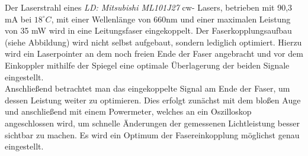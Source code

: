
Der Laserstrahl eines \textit{LD: Mitsubishi ML101J27} cw- Lasers, betrieben mit 90,3 mA bei $18^\circ C$, mit einer Wellenlänge von 660nm und einer maximalen Leistung von 35 mW wird in eine Leitungsfaser eingekoppelt. 
Der Faserkopplungsaufbau (siehe Abbildung) wird nicht selbst aufgebaut, sondern lediglich optimiert. Hierzu wird ein Laserpointer an dem noch freien Ende der Faser angebracht und vor dem Einkoppler mithilfe der Spiegel eine optimale Überlagerung der beiden Signale eingestellt. \\
Anschließend betrachtet man das eingekoppelte Signal am Ende der Faser, um dessen Leistung weiter zu optimieren. Dies erfolgt zunächst mit dem bloßen Auge und anschließend mit einem Powermeter, welches an ein Oszilloskop angeschlossen wird, um schnelle Änderungen der gemessenen Lichtleistung besser sichtbar zu machen. Es wird ein Optimum der Fasereinkopplung möglichst genau eingestellt. 



